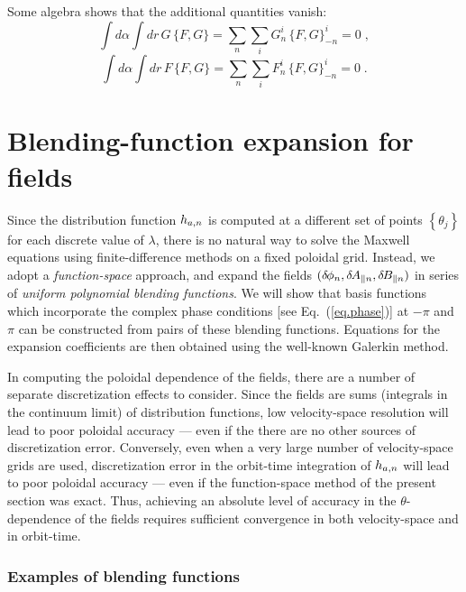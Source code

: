 Some algebra shows that the additional quantities vanish:
%
\begin{equation}
\int d\alpha \int dr \, G \, \{ F , G \} 
= \sum_n \sum_i G_n^i \, \{ F , G \}_{-n}^i = 0  \; ,
\label{invb}
\end{equation}
\begin{equation}
\int d\alpha \int dr \, F \, \{ F , G \} 
= \sum_n \sum_i F_n^i \, \{ F , G \}_{-n}^i = 0 \; .
\label{invc}
\end{equation}

\section{Blending-function expansion for fields}

Since the distribution function $h_{a,n}$ is computed at 
a different set of points $\left\{ \theta_j \right\}$ for 
each discrete value of $\lambda$, there is no natural 
way to solve the Maxwell equations using finite-difference 
methods on a fixed poloidal grid.  Instead, we 
adopt a {\sl function-space} approach, and expand the 
fields $(\delta \hskip -1pt \phi_n,\delta \hskip -1pt A_{\parallel n},\delta \hskip -1pt B_{\parallel n})$ in series of {\sl uniform polynomial 
blending functions}.  We will show that basis functions which 
incorporate the complex phase conditions [see Eq.~(\ref{eq.phase})] 
at $-\pi$ and $\pi$ can be constructed from pairs of these 
blending functions.  Equations for the expansion coefficients 
are then obtained using the well-known Galerkin method.

In computing the poloidal dependence of the fields, there are 
a number of separate discretization effects to consider.  Since 
the fields are sums (integrals in the continuum limit) of distribution 
functions, low velocity-space resolution will lead to poor 
poloidal accuracy --- even if the there are no other sources 
of discretization error.  Conversely, even when a very large 
number of velocity-space grids are used, discretization error
in the orbit-time integration of $h_{a,n}$ will lead to poor poloidal 
accuracy --- even if the function-space method of the present 
section was exact.  Thus, achieving an absolute level of accuracy 
in the $\theta$-dependence of the fields requires sufficient 
convergence in both velocity-space and in orbit-time.

\subsubsection{Examples of blending functions}

